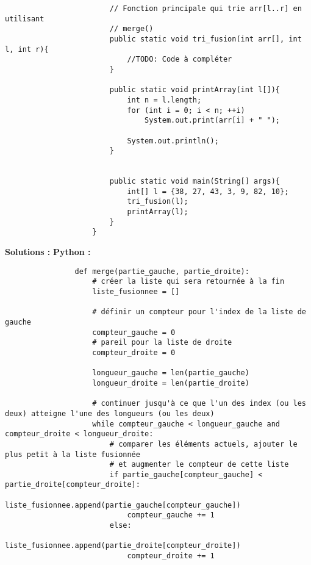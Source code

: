 \begin{Exercice} [20 minutes]
\begin{itemize}
\begin{verbatim}
                        // Fonction principale qui trie arr[l..r] en utilisant 
                        // merge() 
                        public static void tri_fusion(int arr[], int l, int r){
                            //TODO: Code à compléter 
                        }
                        
                        public static void printArray(int l[]){ 
                            int n = l.length; 
                            for (int i = 0; i < n; ++i) 
                                System.out.print(arr[i] + " "); 
                      
                            System.out.println(); 
                        } 
              
                        
                        public static void main(String[] args){
                            int[] l = {38, 27, 43, 3, 9, 82, 10};
                            tri_fusion(l);
                            printArray(l);
                        }
                    }
                \end{verbatim}
    \end{itemize}
    
    \begin{conseil}
    \end{conseil}
    
    \textbf{Solutions :}
        \textbf{Python :}
            
            \begin{verbatim}
                def merge(partie_gauche, partie_droite):
                    # créer la liste qui sera retournée à la fin
                    liste_fusionnee = []   
                    
                    # définir un compteur pour l'index de la liste de gauche
                    compteur_gauche = 0   
                    # pareil pour la liste de droite
                    compteur_droite = 0   
                    
                    longueur_gauche = len(partie_gauche)  
                    longueur_droite = len(partie_droite) 
                    
                    # continuer jusqu'à ce que l'un des index (ou les deux) atteigne l'une des longueurs (ou les deux)
                    while compteur_gauche < longueur_gauche and compteur_droite < longueur_droite:
                        # comparer les éléments actuels, ajouter le plus petit à la liste fusionnée 
                        # et augmenter le compteur de cette liste
                        if partie_gauche[compteur_gauche] < partie_droite[compteur_droite]:
                            liste_fusionnee.append(partie_gauche[compteur_gauche])
                            compteur_gauche += 1
                        else:
                            liste_fusionnee.append(partie_droite[compteur_droite])
                            compteur_droite += 1
                    

\end{verbatim}
\end{Exercice}
